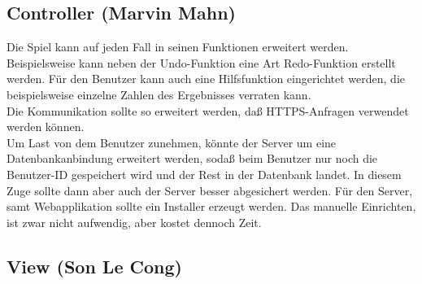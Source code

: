 \documentclass[a4paper,12pt]{scrreprt}
\begin{document}
	\subsection{Controller (Marvin Mahn)}
	Die Spiel kann auf jeden Fall in seinen Funktionen erweitert werden. Beispielsweise kann neben der
	Undo-Funktion eine Art Redo-Funktion erstellt werden. F\"ur den Benutzer kann auch eine
	Hilfsfunktion eingerichtet werden, die beispielsweise einzelne Zahlen des Ergebnisses verraten kann.
	\medskip \\Die Kommunikation sollte so erweitert werden, da{\ss} HTTPS-Anfragen verwendet
	werden k\"onnen.\medskip \\
	Um Last von dem Benutzer zunehmen, k\"onnte der Server um eine Datenbankanbindung erweitert
	werden, soda{\ss} beim Benutzer nur noch die Benutzer-ID gespeichert wird und der Rest in der
	Datenbank landet. In diesem Zuge sollte dann aber auch der Server besser abgesichert werden. F\"ur
	den Server, samt Webapplikation sollte ein Installer erzeugt werden. Das manuelle Einrichten, ist zwar
	nicht aufwendig, aber kostet dennoch Zeit.
	\subsection{View (Son Le Cong)}
\end{document}

